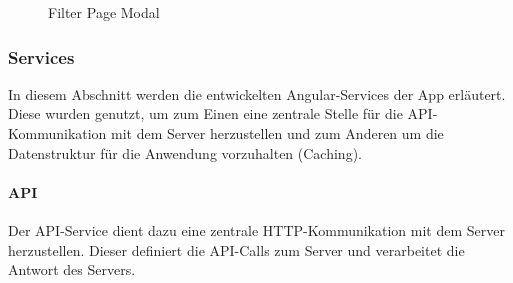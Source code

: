 \documentclass[a4paper, 11pt, DIV=11, listof=numbered, numbers=noenddot]{scrartcl}
\begin{document}
	\begin{figure}[!htbp]
		\centering
		\hfill%
		\hfill%
		\caption{Filter Page Modal}\label{fig:app-filter}
	\end{figure}

	\subsubsection{Services}
	In diesem Abschnitt werden die entwickelten Angular-Services der App erläutert. Diese wurden genutzt, um zum Einen eine zentrale Stelle für die API-Kommunikation mit dem Server herzustellen und zum Anderen um die Datenstruktur für die Anwendung vorzuhalten (Caching).

	\paragraph{API}
	Der API-Service dient dazu eine zentrale HTTP-Kommunikation mit dem Server herzustellen. Dieser definiert die API-Calls zum Server und verarbeitet die Antwort des Servers.
\end{document}
